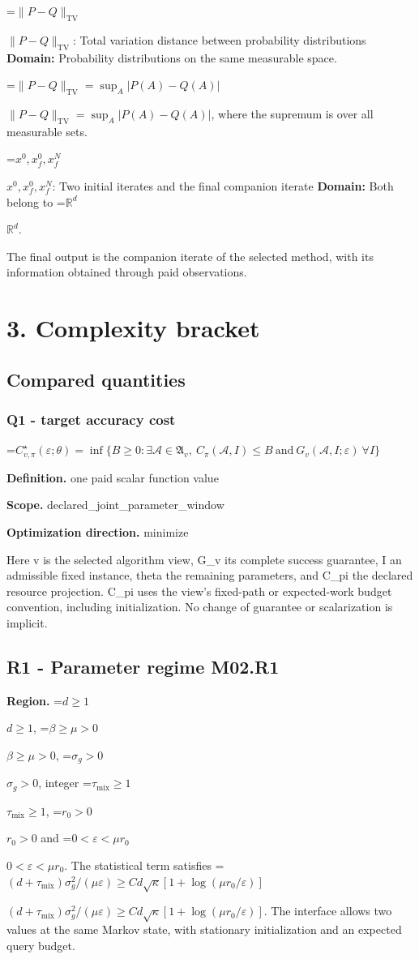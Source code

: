 \documentclass[10pt,a4paper]{article}
\newcommand{\AtlasMath}[1]{\par\begingroup\centering\setbox0=\hbox{$\displaystyle #1$}\ifdim\wd0>1.4\linewidth\typeout{ATLAS WIDE FORMULA: \the\wd0}\fi\ifdim\wd0>\linewidth\resizebox{\linewidth}{!}{\box0}\else\box0\fi\par\endgroup}
\newcommand{\AtlasInlineMath}[1]{\begingroup\setbox0=\hbox{$#1$}\ifdim\wd0>.4\linewidth\endgroup\AtlasMath{#1}\else\endgroup$#1$\fi}
\begin{document}
\AtlasInlineMath{\|P-Q\|_{\mathrm{TV}}}: Total variation distance between probability distributions \textbf{Domain:} Probability distributions on the same measurable space.

\AtlasInlineMath{\|P-Q\|_{\mathrm{TV}}=\sup_A|P(A)-Q(A)|}, where the supremum is over all measurable sets.

\AtlasInlineMath{x^0,x_f^0,x_f^N}: Two initial iterates and the final companion iterate \textbf{Domain:} Both belong to \AtlasInlineMath{\mathbb{R}^d}.

The final output is the companion iterate of the selected method, with its information obtained through paid observations.

\section{3. Complexity bracket}
\subsection{Compared quantities}
\subsubsection{Q1 - target accuracy cost}
\AtlasMath{C^\star_{v,\pi}(\varepsilon;\theta)=\inf\{B\ge0:\exists\mathcal A\in\mathfrak A_v,\ C_\pi(\mathcal A,I)\le B\ \text{and}\ G_v(\mathcal A,I;\varepsilon)\ \forall I\}}
\textbf{Definition.} one paid scalar function value

\textbf{Scope.} declared\_joint\_parameter\_window

\textbf{Optimization direction.} minimize

Here v is the selected algorithm view, G\_v its complete success guarantee, I an admissible fixed instance, theta the remaining parameters, and C\_pi the declared resource projection. C\_pi uses the view's fixed-path or expected-work budget convention, including initialization. No change of guarantee or scalarization is implicit.

\subsection{R1 - Parameter regime M02.R1}
\textbf{Region.} \AtlasInlineMath{d\ge1}, \AtlasInlineMath{\beta\ge\mu>0}, \AtlasInlineMath{\sigma_g>0}, integer \AtlasInlineMath{\tau_{\mathrm{mix}}\ge1}, \AtlasInlineMath{r_0>0} and \AtlasInlineMath{0<\varepsilon<\mu r_0}. The statistical term satisfies \AtlasInlineMath{(d+\tau_{\mathrm{mix}})\sigma_g^2/(\mu\varepsilon)\ge Cd\sqrt\kappa[1+\log(\mu r_0/\varepsilon)]}. The interface allows two values at the same Markov state, with stationary initialization and an expected query budget.
\end{document}
